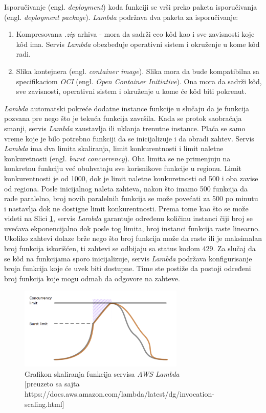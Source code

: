 \documentclass[12pt,oneside]{memoir}
\begin{document}
Isporučivanje (engl. \emph{deployment}) koda funkciji se vrši preko paketa isporučivanja (engl. \emph{deployment package}). \emph{Lambda} podržava dva paketa za isporučivanje:
\begin{enumerate}
  \item Kompresovana \emph{.zip} arhiva - mora da sadrži ceo kôd kao i sve zavisnosti koje kôd ima. Servis \emph{Lambda} obezbeđuje operativni sistem i okruženje u kome kôd radi.
  \item Slika kontejnera (engl. \emph{container image}). Slika mora da bude kompatibilna sa specifikaciom \emph{OCI} (engl. \emph{Open Container Initiative}). Ona mora da sadrži kôd, sve zavisnosti, operativni sistem i okruženje u kome će kôd biti pokrenut.
\end{enumerate}
  
\emph{Lambda} automatski pokreće dodatne instance funkcije u slučaju da je funkcija pozvana pre nego što je tekuća funkcija završila. Kada se protok saobraćaja smanji, servis \emph{Lambda} zaustavlja ili uklanja trenutne instance. Plaća se samo vreme koje je bilo potrebno funkciji da se inicijalizuje i da obradi zahtev. Servis \emph{Lambda} ima dva limita skaliranja, limit konkurentnosti i limit naletne konkuretnosti (engl. \emph{burst concurrency}). Oba limita se ne primenjuju na konkretnu funkciju već obuhvataju sve korisnikove funkcije u regionu. Limit konkurentnosti je od 1000, dok je limit naletne konkuretnosti od 500 i oba zavise od regiona. Posle inicijalnog naleta zahteva, nakon što imamo 500 funkcija da rade paralelno, broj novih paralelnih funkcija se može povećati za 500 po minutu i nastavlja dok ne dostigne limit konkurentnosti. Prema tome kao što se može videti na Slici \ref{fig:awsLambdaSkaliranje}, servis \emph{Lambda} garantuje određenu količinu instanci čiji broj se uvećava ekponencijalno dok posle tog limita, broj instanci funkcija raste linearno. Ukoliko zahtevi dolaze brže nego što broj funkcija može da raste ili je maksimalan broj funkcija iskorišćen, ti zahtevi se odbijaju sa status kodom 429. Za slučaj da se kôd na funkcijama sporo inicijalizuje, servis \emph{Lambda} podržava konfigurisanje broja funkcija koje će uvek biti dostupne. Time ste postiže da postoji određeni broj funkcija koje mogu odmah da odgovore na zahteve.
  

\begin{figure}[!ht]
  \centering
  \includegraphics[width=0.7\textwidth]{AWS-Lambda-skaliranje.png}
  \caption{Grafikon skaliranja funkcija servisa \emph{AWS Lambda}\\\footnotesize[preuzeto sa sajta https://docs.aws.amazon.com/lambda/latest/dg/invocation-scaling.html]}
  \label{fig:awsLambdaSkaliranje}
\end{figure}
  
\end{document}
